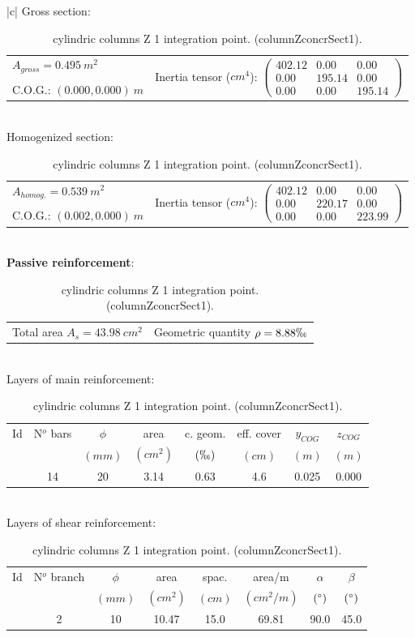 \begin{table}
\begin{center}
\begin{tabular}{|c|}
\hline
Gross section:\\
\hline
\begin{tabular}{ll}
$A_{gross}= 0.495\ m^2$ & \multirow{3}{*}{Inertia tensor ($cm^4$): $ \left( \begin{array}{ccc}402.12 & 0.00 & 0.00 \\ 0.00 & 195.14 &  0.00 \\ 0.00 &  0.00 & 195.14 \end{array} \right)$} \\
& \\
C.O.G.: $(0.000,0.000)\ m$  & \\
\end{tabular} \\
\hline
Homogenized section:\\
\hline
\begin{tabular}{ll}
$A_{homog.}= 0.539\ m^2$ & \multirow{3}{*}{Inertia tensor ($cm^4$): $ \left( \begin{array}{ccc}402.12 & 0.00 & 0.00 \\ 0.00 & 220.17 &  0.00 \\ 0.00 &  0.00 & 223.99 \end{array} \right)$} \\
& \\
C.O.G.: $(0.002,0.000)\ m$  & \\
\end{tabular} \\
\hline
\textbf{Passive reinforcement}:\\
\hline
\begin{tabular}{ll}
Total area $A_s=43.98\ cm^2$ & Geometric quantity $\rho= 8.88\permil$\\
\end{tabular} \\
\hline
Layers of main reinforcement:\\
\hline
\begin{tabular}{cccccccc}
Id & N$^o$ bars & $\phi$ & area & c. geom. & eff. cover & $y_{COG}$ & $z_{COG}$\\
 &  & $(mm)$ & $(cm^2)$ & $(\permil)$ & $(cm)$ & $(m)$ & $(m)$\\
\hline
 & 14 & 20 &  3.14 & 0.63 &  4.6 & 0.025 & 0.000\\
\end{tabular} \\
\hline
Layers of shear reinforcement:\\
\hline
\begin{tabular}{cccccccc}
Id & N$^o$ branch & $\phi$ & area & spac. & area/m & $\alpha$ & $\beta$\\
 &  & $(mm)$ & $(cm^2)$ & $(cm)$ & $(cm^2/m)$ & $( \degree)$ & $( \degree)$\\
\hline
 & 2 & 10 & 10.47 & 15.0 & 69.81 & 90.0 & 45.0\\
\end{tabular} \\
\hline
\end{tabular}
\end{center}
\caption{cylindric columns Z 1 integration point. (columnZconcrSect1).} \label{tb_columnZconcrSect1}
\end{table}

